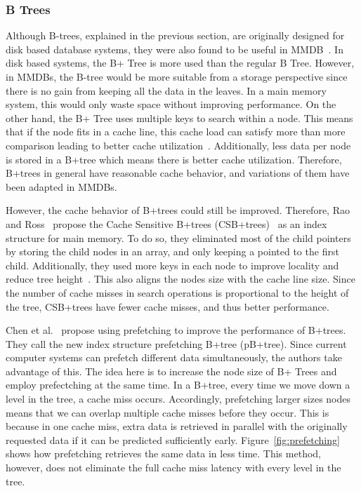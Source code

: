 \documentclass[12pt,a4paper]{article}
\begin{document}
\subsubsection*{B Trees}
Although B-trees, explained in the previous section, are originally designed for disk based database systems, they were also found to be useful in
MMDB~\cite{lehman1986study}. In disk based systems, the B+ Tree is more used than the regular B Tree. However, in MMDBs, the B-tree would be
more suitable from a storage perspective since there is no gain from keeping all the data in the leaves. In a main memory system, this
would only waste space without improving performance. On the other hand, the B+ Tree uses multiple keys to search within a node. This means that
if the node fits in a cache line, this cache load can satisfy more than more comparison leading to better cache utilization~\cite{rao1999cache}. Additionally,
less data per node is stored in a B+tree which means there is better cache utilization. Therefore, B+trees in general have reasonable cache behavior, and
variations of them have been adapted in MMDBs.

However, the cache behavior of B+trees could still be improved. Therefore, Rao and Ross~\cite{rao2000making} propose the Cache Sensitive B+trees
(CSB+trees)~\cite{rao2000making} as an index structure for main memory. To do so, they eliminated most of the child pointers by storing the child nodes
in an array, and only keeping a pointed to the first child. Additionally, they used more keys in each
node to improve locality and reduce tree height~\cite{luan2009prefetching}. This also aligns the nodes size with the cache line size. Since the number of cache
misses in search operations is proportional to the height
of the tree, CSB+trees have fewer cache misses, and thus better performance.

Chen et al.~\cite{chen2001improving} propose using prefetching to improve the performance of B+trees. They call the new index structure prefetching B+tree
(pB+tree). Since current computer systems can prefetch different data simultaneously, the authors take advantage of this. The idea here is to increase the node
size of B+ Trees and employ prefectching at the same time. In a B+tree, every time we move down a level in the tree, a cache miss occurs. Accordingly,
prefetching larger sizes nodes means that we can overlap multiple cache misses before they occur. This is because in one cache miss, extra data is retrieved in
parallel with the originally requested data if it can be predicted sufficiently early. Figure~\ref{fig:prefetching} shows how prefetching retrieves the same
data in less time. This method, however, does not eliminate the full cache miss latency with every level in the tree.
\end{document}
